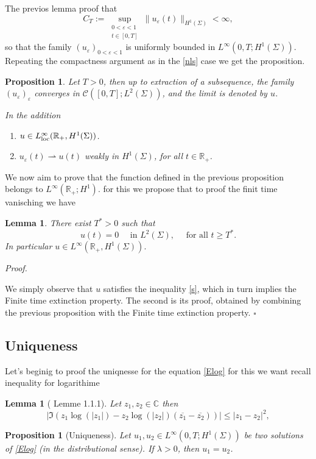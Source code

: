 \documentclass[10pt]{article}
\newtheorem{lemma}[theorem]{Lemma}
\newtheorem{proposition}[theorem]{Proposition}
\renewenvironment{proof}[1][Proof]{%
  \noindent\textit{#1. }%
}{\hfill$\square$\vspace{4pt}}
\begin{document}
The previos lemma proof that \[
C_T:=\sup_{\substack{0<\varepsilon<1 \\ t\in[0,T]}}\|u_\varepsilon(t)\|_{H^1(\Sigma)} < \infty,
\]
so that the family $(u_\varepsilon)_{0<\varepsilon<1}$ is uniformly bounded in $L^\infty(0,T; H^1(\Sigma))$.  
Repeating the compactness argument as in the \eqref{nls} case we get the proposition.
\begin{proposition}\label{of}
Let $T>0$, then up to extraction of a subsequence, the family $(u_\varepsilon)_\varepsilon$ converges in $\mathcal{C}([0,T]; L^2(\Sigma))$, and the limit is denoted by $u$. 

In the addition  
\begin{enumerate}
    \item $u \in L^{\infty}_{\rm loc}(\mathbb{R}_+, H^1(\Sigma))$.
    \item $u_\varepsilon(t) \rightharpoonup u(t)$ weakly in $H^1(\Sigma)$, for all $t \in \mathbb{R}_+$.
\end{enumerate}
\end{proposition}
We now aim to prove that the function defined in the previous proposition
belongs to $L^\infty(\mathbb{R}_+; H^1)$. for this we propose that to proof the finit time vanisching we have \begin{lemma}
    There exist $T^*>0$ such that $$u(t)=0 \quad \text{ in } L^2(\Sigma), \quad \text{ for all } t\geq T^*.$$
    In particular $u\in L^{\infty}(\mathbb{R}_+,H^1(\Sigma)).$
\end{lemma}
\begin{proof}
    We simply observe that $u$ satisfies the inequality \eqref{s}, which in turn implies the Finite time extinction property. The second is its proof, obtained by combining the previous proposition with the Finite time extinction property.
\end{proof}


\subsection{Uniqueness}
Let's beginig to proof the uniqnesse for the equation \eqref{Elog} for this we want recall inequality for logarithime 
\begin{lemma}[\cite{6} Lemme 1.1.1]\label{log}
    Let $z_1,z_2\in \mathbb{C}$ then \[
\big|\Im( z_1\log(|z_1|)-z_2\log(|z_2|)( \overline{z_1}-\overline{z_2}))\big| \le |z_1-z_2|^2,
\]
\end{lemma}
\begin{proposition}[Uniqueness]
Let $u_1, u_2 \in L^{\infty}(0,T; H^1(\Sigma))$ be two solutions of \eqref{Elog} (in the distributional sense). If $\lambda > 0$, then $u_1 = u_2$.
\end{proposition}
\end{document}
